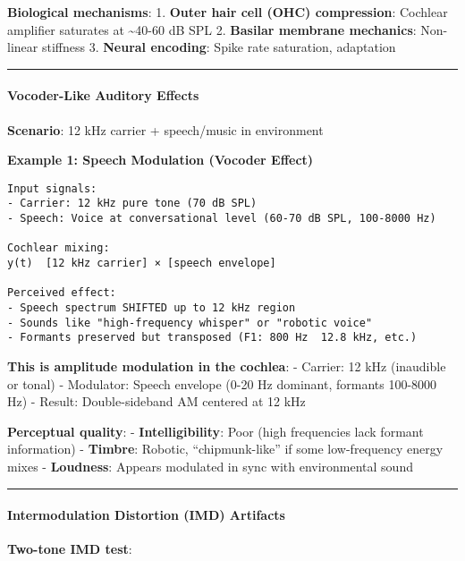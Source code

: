 \textbf{Biological mechanisms}: 1. \textbf{Outer hair cell (OHC)
compression}: Cochlear amplifier saturates at \textasciitilde40-60 dB
SPL 2. \textbf{Basilar membrane mechanics}: Non-linear stiffness 3.
\textbf{Neural encoding}: Spike rate saturation, adaptation

\begin{center}\rule{0.5\linewidth}{0.5pt}\end{center}

\paragraph{Vocoder-Like Auditory
Effects}\label{vocoder-like-auditory-effects}

\textbf{Scenario}: 12 kHz carrier + speech/music in environment

\textbf{Example 1: Speech Modulation (Vocoder Effect)}

\begin{verbatim}
Input signals:
- Carrier: 12 kHz pure tone (70 dB SPL)
- Speech: Voice at conversational level (60-70 dB SPL, 100-8000 Hz)

Cochlear mixing:
y(t)  [12 kHz carrier] × [speech envelope]

Perceived effect:
- Speech spectrum SHIFTED up to 12 kHz region
- Sounds like "high-frequency whisper" or "robotic voice"
- Formants preserved but transposed (F1: 800 Hz  12.8 kHz, etc.)
\end{verbatim}

\textbf{This is amplitude modulation in the cochlea}: - Carrier: 12 kHz
(inaudible or tonal) - Modulator: Speech envelope (0-20 Hz dominant,
formants 100-8000 Hz) - Result: Double-sideband AM centered at 12 kHz

\textbf{Perceptual quality}: - \textbf{Intelligibility}: Poor (high
frequencies lack formant information) - \textbf{Timbre}: Robotic,
``chipmunk-like'' if some low-frequency energy mixes -
\textbf{Loudness}: Appears modulated in sync with environmental sound

\begin{center}\rule{0.5\linewidth}{0.5pt}\end{center}

\paragraph{Intermodulation Distortion (IMD)
Artifacts}\label{intermodulation-distortion-imd-artifacts}

\textbf{Two-tone IMD test}:

